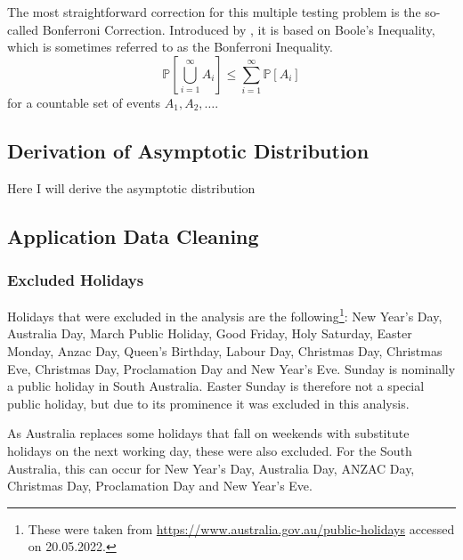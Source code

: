 \documentclass[12pt, a4paper]{article}
\theoremstyle{MAstyle} \newtheorem{assumption}{Assumption}[section]
\theoremstyle{MAstyle} \newtheorem{definition}{Definition}[section]
\theoremstyle{MAstyle} \newtheorem{theorem}{Theorem}[section]
\begin{document}
				The most straightforward correction for this multiple testing problem is the so-called Bonferroni Correction. Introduced by \cite{dunn_multiple_1961}, it is based on Boole's Inequality, which is sometimes referred to as the Bonferroni Inequality.
				\begin{equation}
						\mathbb{P}\left[\bigcup_{i = 1}^{\infty} A_i\right] \leq \sum_{i = 1}^{\infty} \mathbb{P}\left[A_i\right]
					\end{equation}
				for a countable set of events $A_1, A_2, \dots$.
		
		\subsection{Derivation of Asymptotic Distribution}\label{asymp_deriv}
			Here I will derive the asymptotic distribution
			
		\subsection{Application Data Cleaning}\label{Application_Appendix}
			\subsubsection{Excluded Holidays}
			Holidays that were excluded in the analysis are the following\footnote{These were taken from \url{https://www.australia.gov.au/public-holidays} accessed on 20.05.2022.}: New Year's Day, Australia Day, March Public Holiday, Good Friday, Holy Saturday, Easter Monday, Anzac Day, Queen's Birthday, Labour Day, Christmas Day, Christmas Eve, Christmas Day, Proclamation Day and New Year's Eve. Sunday is nominally a public holiday in South Australia. Easter Sunday is therefore not a special public holiday, but due to its prominence it was excluded in this analysis.
			
			As Australia replaces some holidays that fall on weekends with substitute holidays on the next working day, these were also excluded. For the South Australia, this can occur for New Year's Day, Australia Day, ANZAC Day, Christmas Day, Proclamation Day and New Year's Eve.
		
\end{document}
